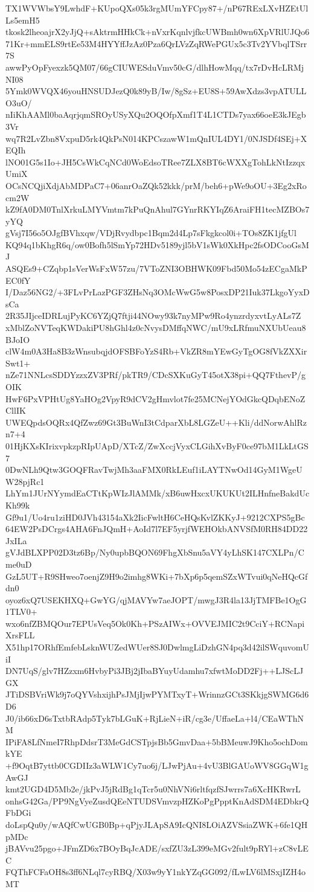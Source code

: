 TX1WVWbsY9LwhdF+KUpoQXs05k3rgMUmYFCpy87+/nP67RExLXvHZEtUlLs5emH5
tkosk2lheoajrX2yJjQ+sAktrmHHkCk+nVxrKqnlvjfkcUWBmh0wn6XpVRlUJQo6
71Kr+mmELS9rtEe53M4HYYffJzAz0Pza6QrLVzZqRWePGUx5c3Tv2YVbqlTSrr7S
awwPyOpFyexzk5QM07/66gCIUWESduVmv50cG/dlhHowMqq/tx7rDvHcLRMjNI08
5Ymk0WVQX46youHNSUDJezQ0k89yB/Iw/8gSz+EU8S+59AwXdzs3vpATULLO3uO/
nIiKhAAMl0baAqrjqmSROyUSyXQu2OQOfpXmf1T4L1CTDs7yax66oeE3kJEgb3Vr
wq7R2LvZbn8VxpuD5rk4QkPsN014KPCszawW1mQnIUL4DY1/0NJSDf4SEj+XEQIh
lNO01G5s1Io+JH5CsWkCqNCd0WoEdsoTRee7ZLX8BT6cWXXgTohLkNtIzzqxUmiX
OCsNCQjiXdjAbMDPaC7+06anrOaZQk52kkk/prM/beh6+pWe9oOU+3Eg2xRocm2W
kZ9fA0DM0TnlXrkuLMYVmtm7kPuQnAhul7GYnrRKYIqZ6AraiFH1tecMZBOs7yYQ
gVsj7I56o5OJgfBVhxqw/VDjRvydbpc1Bqm2d4Lp7sFkgkcol0i+TOs8ZK1jfgUl
KQ94q1bKhgR6q/ow0Bofh5lSmYp72HDv5189yjl5bV1sWk0XkHpc2fsODCooGsMJ
ASQEs9+CZqbp1sVerWsFxW57zu/7VToZNI3OBHWK09Fbd50Mo54zECgaMkPEC0fY
I/Daz56NG2/+3FLvPrLazPGF3ZHsNq3OMcWwG5w8PosxDP21Iuk37LkgoYyxDsCa
2R35JIjceIDRLujPyKC6YZjQ7ftji44NOwy93k7nyMPw9Ro4ynzrdyxvtLyALs7Z
xMblZoNVTeqKWDakiPU8hGhl4z0cNvysDMffqNWC/mU9xLRfmuNXUbUeau8BJoIO
clW4m0A3Ha8B3zWnsubqjdOFSBFoYzS4Rb+VkZR8mYEwGyTgOG8fVkZXXirSwt1+
nZe71NNLcsSDDYzzxZV3PRf/pkTR9/CDcSXKuGyT45otX38pi+QQ7FthevP/gOIK
HwF6PxVPHtUg8YaHOg2VpyR9dCV2gHmvlot7fe25MCNejYOdGkcQDqbENoZCllIK
UWEQpdsOQRx4QfZwz69Gt3BuWnI3tCdparXbL8LGZeU++Kli/ddNorwAhlRzn7+4
01HjKXsKIrixvpkzpRIpUApD/XTcZ/ZwXccjVyxCLGihXvByF0ce97bM1LkLtGS7
0DwNLh9Qtw3GOQFRavTwjMh3aaFMX0RkLEuf1iLAYTNwOd14GyM1WgeUW28pjRc1
LhYm1JUrNYymdEaCTtKpWIzJlAMMk/xB6uwHxcxUKUKUt2ILHnfneBakdUcKh99k
Gf9u1/Uo4ru1ziHD0JVh43154aXk2IicFwltH6CeHQsKvlZKKyJ+9212CXPS5gBc
64EW2PsDCrgs4AHA6FnJQmH+AoId7l7EF5yrjfWEHOkbANVSfM0RH84DD22JxILa
gVJdBLXPP02D3tz6Bp/Ny0upbBQON69FhgXbSnu5aVY4yLhSK147CXLPn/Cme0uD
GzL5UT+R9SHweo7oenjZ9H9o2imhg8WKi+7bXp6p5qemSZxWTvui0qNeHQcGfdn0
oyoz6xQ7USEKHXQ+GwYG/qjMAVYw7aeJOPT/mwgJ3R4la13JjTMFBe1OgG1TLV0+
wxo6nfZBMQOur7EPUsVeq5Ok0Kh+PSzAIWx+OVVEJMIC2t9CciY+RCNapiXrsFLL
X51hp17ORhfEmfebLsknWUZedWUer8SJ0DwlmgLiDzhGN4pq3d42ilSWquvomUiI
DN7UqS/glv7HZzxm6HvbyPi3JBj2jIbaBYuyUdamhu7xfwtMoDD2Fj++LJScLJGX
JTiDSBVriWk9j7oQYVshxijhPsJMjIjwPYMTxyT+WrinnzGCt3SKkjgSWMG6d6D6
J0/ib66xD6sTxtbRAdp5Tyk7bLGuK+RjLieN+iR/cg3e/UffaeLa+l4/CEaWThNM
IPiFA8LfNmeI7RhpDdsrT3MeGdCSTpjsBb5GmvDaa+5bBMeuwJ9Kho5ochDomkYE
+f9OqtB7yttb0CGDIIz3aWLW1Cy7uo6j/LJwPjAu+4vU3BlGAUoWV8GGqW1gAwGJ
kmt2UGD4D5Mb2e/jkPvJ5jRdBg1qTcr5u0NhVNi6rltfqzfSJwrrs7a6XcHKRwrL
onhsG42Ga/PP9NgVyeZusdQEeNTUDSVmvzpHZKoPgPpptKnAdSDM4EDbkrQFbDGi
doLspQu0y/wAQfCwUGB0Bp+qPjyJLApSA9IcQNI8LOiAZVSsiaZWK+6fe1QHpMDc
jBAVvu25pgo+JFmZD6x7BOyBqJcADE/sxfZU3zL399eMGv2fult9pRYl+zC8vLEC
FQThFCFaOH8s3ff6NLql7cyRBQ/X03w9yY1nkYZqGG092/fLwLV6lMSxjIZH4oMT
